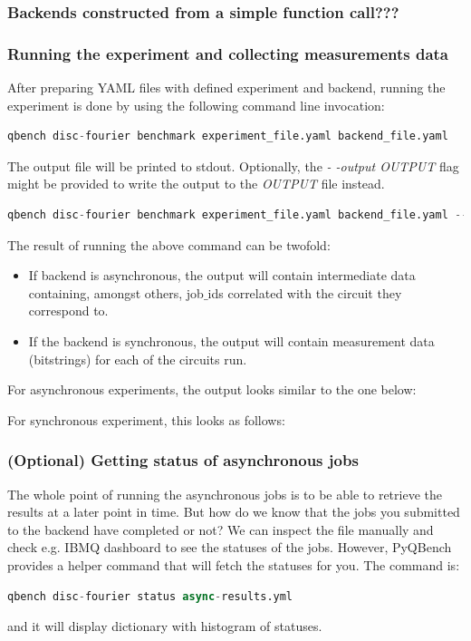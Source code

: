 \documentclass[preprint,12pt, a4paper, dvipsnames]{elsarticle}
\newcommand{\1}{{\rm 1\hspace{-0.9mm}l}}
\begin{document}
\subsubsection{Backends constructed from a simple function call???}

\subsubsection{Running the experiment and collecting measurements data}
After preparing YAML files with defined experiment and backend, 
running the experiment is done by using the following command line invocation:
\begin{lstlisting}[language=Python]
qbench disc-fourier benchmark experiment_file.yaml backend_file.yaml
\end{lstlisting}
The output file will be printed to stdout. Optionally, the \textit{- -output OUTPUT} flag might be provided to write the output to the \textit{OUTPUT} file instead.
\begin{lstlisting}[language=Python]
qbench disc-fourier benchmark experiment_file.yaml backend_file.yaml --async-results.yml
\end{lstlisting}
The result of running the above command can be twofold:
\begin{itemize}
	\item If backend is asynchronous, the output will contain intermediate data containing, amongst others, job$\_$ids correlated with the circuit they correspond to.
	\item If the backend is synchronous, the output will contain measurement data (bitstrings) for each of the circuits run.
\end{itemize}
For asynchronous experiments, the output looks similar to the one below:

For synchronous experiment, this looks as follows:

\subsubsection{(Optional) Getting status of asynchronous jobs}
The whole point of running the asynchronous jobs is to be able to retrieve the results at a later point in time. But how do we know that the jobs you submitted to the backend have completed or not? We can inspect the file manually and check e.g. IBMQ dashboard to see the statuses of the jobs. However, PyQBench provides a helper command that will fetch the statuses for you. The command is:
\begin{lstlisting}[language=Python]
qbench disc-fourier status async-results.yml
\end{lstlisting}
and it will display dictionary with histogram of statuses.
\end{document}
